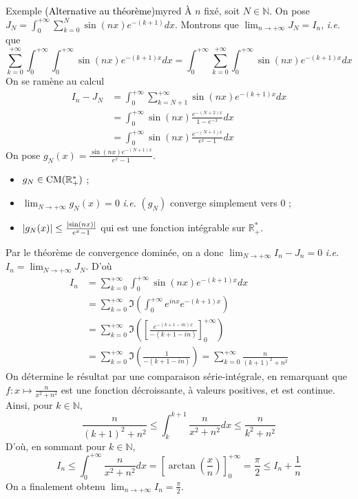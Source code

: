 \begin{omed}{Exemple \textcolor{black}{(Alternative au théorème)}}{myred}
        À $n$ fixé, soit $N \in \mathbb{N}$. On pose $J_N = \int_{0}^{+\infty} \sum_{k=0}^{N} \sin(nx) e^{-(k+1)} dx$. Montrons que $\lim_{n \to +\infty} J_N = I_n$, \textit{i.e.} que 
        \[ \sum_{k=0}^{+\infty} \int_{0}^{+\infty} \int_{0}^{+\infty} \sin(nx) e^{-(k+1)x} dx = \int_{0}^{+\infty} \sum_{k=0}^{+\infty} \int_{0}^{+\infty} \sin(nx) e^{-(k+1)x} dx \]   
        On se ramène au calcul 
        \begin{align*}
            I_n - J_N 
            &= \int_{0}^{+\infty} \sum_{k=N+1}^{+\infty} \sin(nx) e^{-(k+1)x} dx \\
            &= \int_{0}^{+\infty} \sin(nx) \frac{e^{-(N+2)x}}{1 - e^{-x}} dx \\
            &= \int_{0}^{+\infty} \sin(nx) \frac{e^{-(N+1)x}}{e^x - 1} dx
        \end{align*}
        On pose $g_N(x) = \frac{\sin(nx) e^{-(N+1)x}}{e^x - 1}$.\
        \begin{itemize}
            \item $g_N \in \operatorname{CM}(\mathbb{R}_+^*)$ ;
            \item $\lim_{N \to +\infty} g_N(x) = 0$ \textit{i.e.} $(g_N)$ converge simplement vers $0$ ;
            \item $\left\lvert g_N(x)\right\rvert \leq \frac{\left\lvert \sin(nx)\right\rvert}{e^x - 1}$ qui est une fonction intégrable sur $\mathbb{R}_+^*$.
        \end{itemize}
        Par le théorème de convergence dominée, on a donc $\lim_{N \to +\infty} I_n - J_n =0$ \textit{i.e.} $I_n = \lim_{N \to +\infty} J_N$. D’où 
        \begin{align*}
            I_n 
            &= \sum_{k=0}^{+\infty} \int_{0}^{+\infty} \sin(nx) e^{-(k+1)x} dx \\
            &= \sum_{k=0}^{+\infty} \Im\left(\int_{0}^{+\infty} e^{inx} e^{-(k+1)x}\right) \\
            &= \sum_{k=0}^{+\infty} \Im\left(\left[\frac{e^{-(k+1 -in)x}}{-(k + 1 - in)}\right]_0^{+\infty}\right) \\
            &= \sum_{k=0}^{+\infty} \Im(\frac{1}{-(k+1-in)}) = \sum_{k=0}^{+\infty} \frac{n}{(k+1)^2 + n^2} 
        \end{align*} 
        On détermine le résultat par une comparaison série-intégrale, en remarquant que $f : x \mapsto \frac{n}{x^2 + n^2}$ est une fonction décroissante, à valeurs positives, et est continue. Ainsi, pour $k \in \mathbb{N}$,
        \[ \frac{n}{(k+1)^2 + n^2} \leq \int_{k}^{k+1} \frac{n}{x^2 + n^2}dx \leq \frac{n}{k^2 + n^2} \]   
        D’où, en sommant pour $k \in \mathbb{N}$, 
        \[ I_n \leq \int_{0}^{+\infty} \frac{n}{x^2 + n^2} dx = \left[\arctan\left(\frac{x}{n}\right)\right]_0^{+\infty} = \frac{\pi}{2} \leq I_n + \frac{1}{n} \]   
        On a finalement obtenu $\lim_{n \to +\infty} I_n = \frac{\pi}{2}$. 
    \end{omed}

